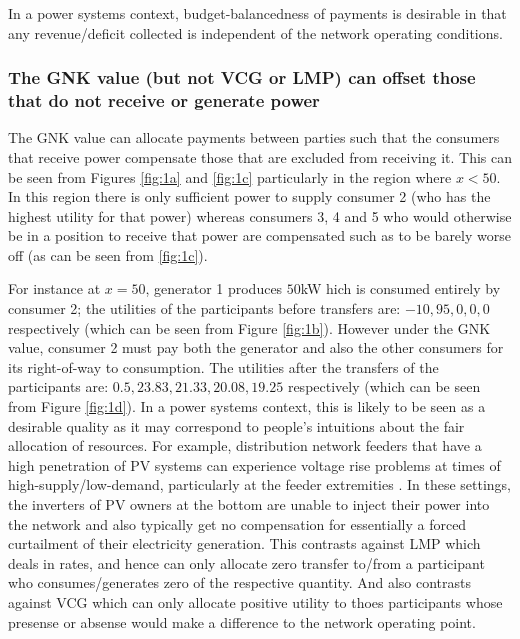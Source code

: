 In a power systems context, budget-balancedness of payments is desirable in that any revenue/deficit collected is independent of the network operating conditions.

\subsubsection*{The GNK value (but not VCG or LMP) can offset those that do not receive or generate power}
The GNK value can allocate payments between parties such that the consumers that receive power compensate those that are excluded from receiving it.
This can be seen from Figures \ref{fig:1a} and \ref{fig:1c} particularly in the region where $x<50$.
In this region there is only sufficient power to supply consumer 2 (who has the highest utility for that power) whereas consumers 3, 4 and 5 who would otherwise be in a position to receive that power are
compensated such as to be barely worse off (as can be seen from \ref{fig:1c}).

For instance at $x=50$, generator 1 produces $50$kW hich is consumed entirely by consumer 2; the utilities of the participants before transfers are: $-10, 95, 0, 0, 0$ respectively (which can be seen from Figure \ref{fig:1b}).
However under the GNK value, consumer 2 must pay both the generator and also the other consumers for its right-of-way to consumption.
The utilities after the transfers of the participants are: $0.5, 23.83, 21.33, 20.08, 19.25$ respectively (which can be seen from Figure \ref{fig:1d}).
In a power systems context, this is likely to be seen as a desirable quality as it may correspond to people's intuitions about the fair allocation of resources.
For example, distribution network feeders that have a high penetration of PV systems can experience voltage rise problems at 
times of high-supply/low-demand, particularly at the feeder extremities \cite{feeder1}. 
In these settings, the inverters of PV owners at the bottom are unable to inject their power into the network and also typically get no compensation for essentially a forced curtailment of their electricity generation.
This contrasts against LMP which deals in rates, and hence can only allocate zero transfer to/from a participant who consumes/generates zero of the respective quantity.
And also contrasts against VCG which can only allocate positive utility to thoes participants whose presense or absense would make a difference to the network operating point.

